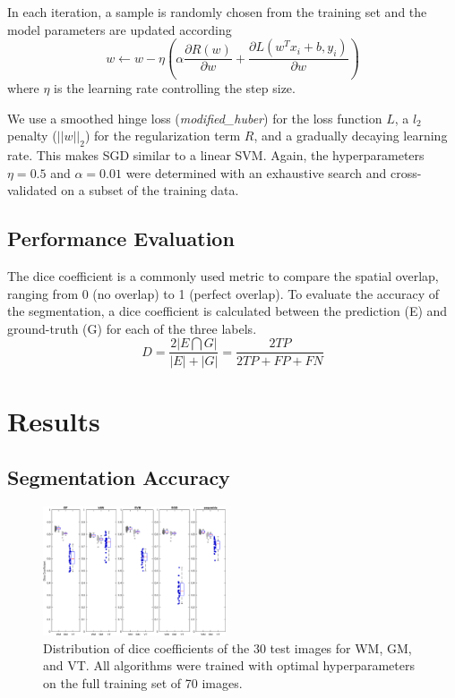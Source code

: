 \documentclass[journal]{IEEEtran}
\begin{document}
In each iteration, a sample is randomly chosen from the training set and the model parameters are updated according
\begin{equation}
w \leftarrow w - \eta \left(\alpha \frac{\partial R(w)}{\partial w} + \frac{\partial L (w^Tx_i + b, y_i)}{\partial w} \right)
\end{equation}
where $\eta$ is the learning rate controlling the step size.

We use a smoothed hinge loss (\textit{modified\_huber}) for the loss function $L$, a $l_2$ penalty ($||w||_2$) for the regularization term $R$, and a gradually decaying learning rate. This makes SGD similar to a linear SVM. Again, the hyperparameters $\eta = 0.5$ and $\alpha = 0.01$ were determined with an exhaustive search and cross-validated on a subset of the training data.


\subsection{Performance Evaluation}\label{ch.eval}
The dice coefficient is a commonly used metric to compare the spatial overlap, ranging from 0 (no overlap) to 1 (perfect overlap). To evaluate the accuracy of the segmentation, a dice coefficient is calculated between the prediction (E) and ground-truth (G) for each of the three labels. 
\begin{equation}
D = \frac{2|E \bigcap G|}{|E| + |G|} = \frac{2 TP}{2 TP + FP + FN}
\end{equation}
\vspace{1mm}
\section{Results}
\subsection{Segmentation Accuracy}
\begin{figure}
	\centering
	\includegraphics[width=0.48\textwidth]{images/boxplot}
	\caption{Distribution of dice coefficients of the 30 test images for WM, GM, and VT. All algorithms were trained with optimal hyperparameters on the full training set of 70 images.}\label{f.boxplot}
\end{figure}
\end{document}

